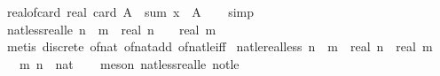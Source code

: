 \begin{isabellebody}
%
\endisadelimproof
%
\isadelimdocument
%
\endisadelimdocument
%
\isatagdocument
%
\isamarkuptrue%
%
\endisatagdocument
{\isafolddocument}%
%
\isadelimdocument
%
\endisadelimdocument
{}\isamarkupfalse%
\ real{\isacharunderscore}{\kern0pt}of{\isacharunderscore}{\kern0pt}card{\isacharcolon}{\kern0pt}\ {\isachardoublequoteopen}real\ {\isacharparenleft}{\kern0pt}card\ A{\isacharparenright}{\kern0pt}\ {\isacharequal}{\kern0pt}\ sum\ {\isacharparenleft}{\kern0pt}{\isasymlambda}x{\isachardot}{\kern0pt}\ {}{\isacharparenright}{\kern0pt}\ A{\isachardoublequoteclose}\isanewline
%
\isadelimproof
\ \ %
\endisadelimproof
%
\isatagproof
{}\isamarkupfalse%
\ simp%
\endisatagproof
{\isafoldproof}%
%
\isadelimproof
\isanewline
%
\endisadelimproof
\isanewline
{}\isamarkupfalse%
\ nat{\isacharunderscore}{\kern0pt}less{\isacharunderscore}{\kern0pt}real{\isacharunderscore}{\kern0pt}le{\isacharcolon}{\kern0pt}\ {\isachardoublequoteopen}n\ {\isacharless}{\kern0pt}\ m\ {\isasymlongleftrightarrow}\ real\ n\ {\isacharplus}{\kern0pt}\ {}\ {\isasymle}\ real\ m{\isachardoublequoteclose}\isanewline
%
\isadelimproof
\ \ %
\endisadelimproof
%
\isatagproof
{}\isamarkupfalse%
\ {\isacharparenleft}{\kern0pt}metis\ discrete\ of{\isacharunderscore}{\kern0pt}nat{\isacharunderscore}{\kern0pt}{}\ of{\isacharunderscore}{\kern0pt}nat{\isacharunderscore}{\kern0pt}add\ of{\isacharunderscore}{\kern0pt}nat{\isacharunderscore}{\kern0pt}le{\isacharunderscore}{\kern0pt}iff{\isacharparenright}{\kern0pt}%
\endisatagproof
{\isafoldproof}%
%
\isadelimproof
\isanewline
%
\endisadelimproof
\isanewline
{}\isamarkupfalse%
\ nat{\isacharunderscore}{\kern0pt}le{\isacharunderscore}{\kern0pt}real{\isacharunderscore}{\kern0pt}less{\isacharcolon}{\kern0pt}\ {\isachardoublequoteopen}n\ {\isasymle}\ m\ {\isasymlongleftrightarrow}\ real\ n\ {\isacharless}{\kern0pt}\ real\ m\ {\isacharplus}{\kern0pt}\ {}{\isachardoublequoteclose}\isanewline
\ \ \ m\ n\ {\isacharcolon}{\kern0pt}{\isacharcolon}{\kern0pt}\ nat\isanewline
%
\isadelimproof
\ \ %
\endisadelimproof
%
\isatagproof
{}\isamarkupfalse%
\ {\isacharparenleft}{\kern0pt}meson\ nat{\isacharunderscore}{\kern0pt}less{\isacharunderscore}{\kern0pt}real{\isacharunderscore}{\kern0pt}le\ not{\isacharunderscore}{\kern0pt}le{\isacharparenright}{\kern0pt}%
\endisatagproof
{\isafoldproof}%
%
\isadelimproof
\isanewline
%
\endisadelimproof
\isanewline
{}\isamarkupfalse%

\end{isabellebody}
